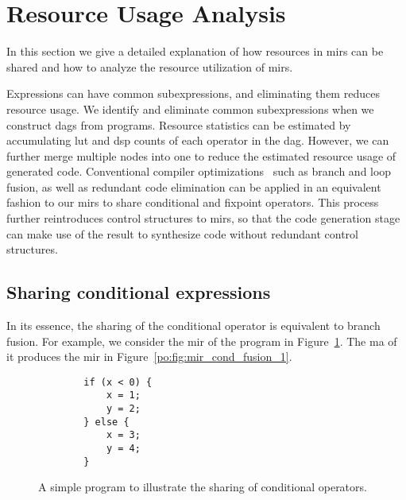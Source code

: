 \section{Resource Usage Analysis}
\label{po:sec:resource_usage_analysis}

In this section we give a detailed explanation of how resources in \glspl{mir}
can be shared and how to analyze the resource utilization of \glspl{mir}.

Expressions can have common subexpressions, and eliminating them reduces
resource usage.  We identify and eliminate common subexpressions when we
construct \glspl{dag} from programs.  Resource statistics can be estimated
by accumulating \gls{lut} and \gls{dsp} counts of each operator in the
\gls{dag}\@.  However, we can further merge multiple nodes into one to reduce
the estimated resource usage of generated code.  Conventional compiler
optimizations~\cite{kuck81} such as branch and loop fusion, as well as
redundant code elimination can be applied in an equivalent fashion to our
\glspl{mir} to share conditional and fixpoint operators.  This process further
reintroduces control structures to \glspl{mir}, so that the code generation
stage can make use of the result to synthesize code without redundant control
structures.


\subsection{Sharing conditional expressions}

In its essence, the sharing of the conditional operator is equivalent to
branch fusion.  For example, we consider the \gls{mir} of the program in
Figure~\ref{po:lst:branch_example}.  The \gls{ma} of it produces the \gls{mir}
in Figure~\ref{po:fig:mir_cond_fusion_1}.

\begin{figure}[ht]
    \centering
    \begin{lstlisting}
        if (x < 0) {
            x = 1;
            y = 2;
        } else {
            x = 3;
            y = 4;
        }
    \end{lstlisting}
    \caption{%
        A simple program to illustrate the sharing of conditional operators.
    }\label{po:lst:branch_example}
\end{figure}


